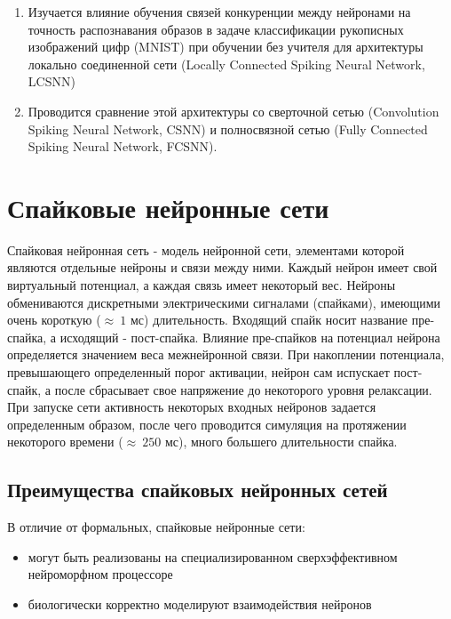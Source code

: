 \documentclass[a4paper]{article}
\begin{document}
\begin{enumerate}
 \item Изучается влияние обучения связей конкуренции \cite{MaxActiv1} \cite{MaxActiv2} между нейронами на точность распознавания образов в задаче классификации рукописных изображений цифр (MNIST) при обучении без учителя для архитектуры локально соединенной сети (Locally Connected Spiking Neural Network, LCSNN) \cite{saunders2019locally}
 
 \item Проводится сравнение этой архитектуры со сверточной сетью (Convolution Spiking Neural Network, CSNN) и полносвязной сетью (Fully Connected Spiking Neural Network, FCSNN).

\end{enumerate}

\clearpage

\section{Спайковые нейронные сети}
Спайковая нейронная сеть - модель нейронной сети, элементами которой являются  отдельные нейроны и связи между ними. Каждый нейрон имеет свой виртуальный потенциал, а каждая связь имеет некоторый вес. Нейроны обмениваются дискретными электрическими сигналами (спайками), имеющими очень короткую ($ \approx ~1$ мс) длительность. Входящий спайк носит название пре-спайка, а исходящий - пост-спайка.  Влияние пре-спайков на потенциал нейрона определяется значением веса межнейронной связи. При накоплении потенциала, превышающего определенный порог активации, нейрон сам испускает пост-спайк, а после сбрасывает свое напряжение до некоторого уровня релаксации. При запуске сети активность некоторых входных нейронов задается определенным образом, после чего проводится симуляция на протяжении некоторого времени ($\approx ~250$ мс), много большего длительности спайка.


\subsection{Преимущества спайковых нейронных сетей}
В отличие от формальных, спайковые нейронные сети:

\begin{itemize}
 \item могут быть реализованы на специализированном сверхэффективном нейроморфном процессоре
 \item биологически корректно моделируют взаимодействия нейронов
\end{itemize}
\end{document}
